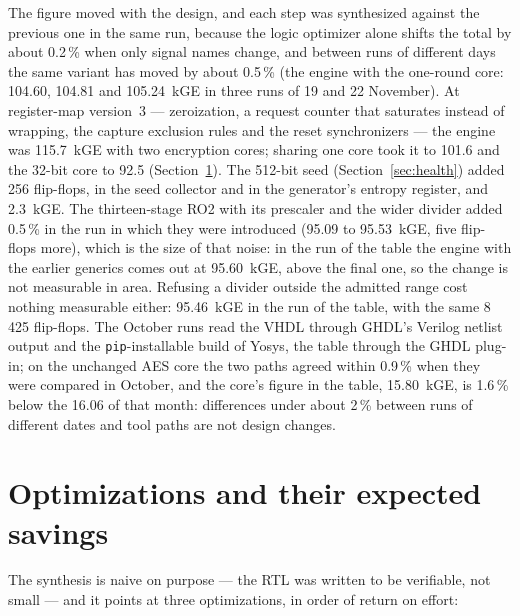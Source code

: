 The figure moved with the design, and each step was synthesized against
the previous one in the same run, because the logic optimizer alone
shifts the total by about 0.2\,\% when only signal names change, and
between runs of different days the same variant has moved by about
0.5\,\% (the engine with the one-round core: 104.60, 104.81 and
105.24~kGE in three runs of 19 and 22 November). At
register-map version~3 --- zeroization, a request counter that saturates
instead of wrapping, the capture exclusion rules and the reset
synchronizers --- the engine was 115.7~kGE with two encryption cores;
sharing one core took it to 101.6 and the 32-bit core to 92.5
(Section~\ref{sec:opt}). The 512-bit seed (Section~\ref{sec:health})
added 256 flip-flops, in the seed collector and in the generator's
entropy register, and 2.3~kGE. The thirteen-stage RO2 with its prescaler
and the wider divider added 0.5\,\% in the run in which they were
introduced (95.09 to 95.53~kGE, five flip-flops more), which is the size
of that noise: in the run of the table the engine with the earlier
generics comes out at 95.60~kGE, above the final one, so the change is
not measurable in area. Refusing a divider outside the admitted range
cost nothing measurable either: 95.46~kGE in the run of the table, with
the same 8\,425 flip-flops. The October runs
read the \ac{VHDL} through GHDL's Verilog netlist output and the
\texttt{pip}-installable build of Yosys, the table through the GHDL
plug-in; on the unchanged AES core the two paths agreed within 0.9\,\%
when they were compared in October, and the core's figure in the table,
15.80~kGE, is 1.6\,\% below the 16.06 of that month: differences under
about 2\,\% between runs of different dates and tool paths are not
design changes.

\section{Optimizations and their expected savings}
\label{sec:opt}

The synthesis is naive on purpose --- the \ac{RTL} was written to be
verifiable, not small --- and it points at three optimizations, in order
of return on effort:

